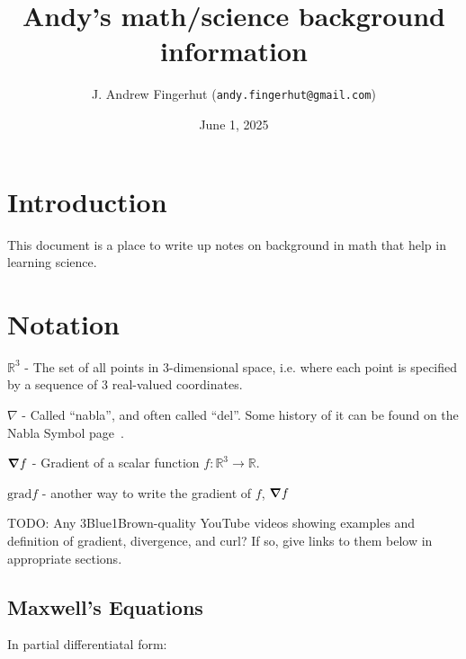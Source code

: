 \documentclass[a4paper]{article}
\title{Andy's math/science background information}
\author{J. Andrew Fingerhut (\texttt{andy.fingerhut@gmail.com})}
\date{
        June 1, 2025
}
\theoremstyle{plain}
\theoremstyle{definition}
\newcommand{\reals}{\mathbb{R}}
\newcommand{\del}{\nabla}
\begin{document}
\maketitle


\tableofcontents

\section{Introduction}
\label{sec:intro}

This document is a place to write up notes on background in math that
help in learning science.


\section{Notation}
\label{sec:notation}

$\reals^3$ - The set of all points in 3-dimensional space,
i.e. where each point is specified by a sequence of 3 real-valued
coordinates.

$\del$ - Called ``nabla'', and often called ``del''.  Some history of
it can be found on the Nabla Symbol page~\cite{NablaSymbol}.

$\grad f$ - Gradient of a scalar function $f: \reals^3 \rightarrow
\reals$.

$\text{grad} f$ - another way to write the gradient of $f$, $\grad f$

TODO: Any 3Blue1Brown-quality YouTube videos showing examples and
definition of gradient, divergence, and curl?  If so, give links to
them below in appropriate sections.


\subsection{Maxwell's Equations}
\label{sec:maxwellseqns}

In partial differentiatal form:
\end{document}
